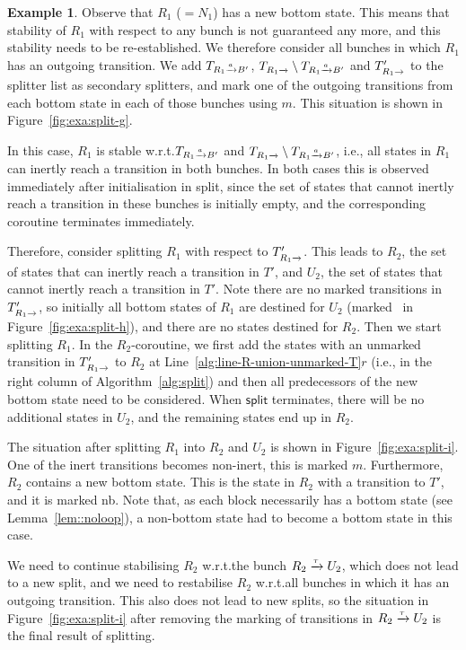 \documentclass[a4paper,10pt]{article}
\theoremstyle{definition}
\newtheorem{example}[definition]{Example}
\theoremstyle{plain}
\newcommand{\pijl}[1]{\mathrel{\text{$\xrightarrow{\smash[t]{#1}}$}}}
\newlength{\statetextwidth}\settowidth{\statetextwidth}{$s_0$}
\newcommand{\bluestatetext}{\smash{\tikz[baseline=-0.37\statetextwidth]{\node[blue state,thin,inner sep=0pt]{\makebox[0.5\statetextwidth]{}};}}}
\begin{document}
\begin{example}
Observe that $R_1$ ($=N_1$) has a new bottom state.
This means that stability of $R_1$ with respect to any bunch is not guaranteed any more, and this stability needs to be re-established.
We therefore consider all bunches in which $R_1$ has an outgoing transition.
We add $T_{R_1\pijl{a}B'}$, $T_{R_1 \pijl{}} \setminus T_{R_1 \pijl{a} B'}$ and $T'_{R_1\pijl{}}$ to the splitter list as secondary splitters,
and mark one of the outgoing transitions from each bottom state in each of those bunches using {\color{gray}$m$}.
This situation is shown in Figure~\ref{fig:exa:split-g}.

In this case, $R_1$ is stable w.r.t.\@ $T_{R_1\pijl{a}B'}$ and $T_{R_1 \pijl{}} \setminus T_{R_1 \pijl{a} B'}$, i.e., all states in $R_1$ can inertly reach a transition in both bunches.
In both cases this is observed immediately after initialisation in split,
since the set of states that cannot inertly reach a transition in these bunches is initially empty, and the corresponding coroutine terminates immediately.

Therefore, consider splitting $R_1$ with respect to $T'_{R_1\pijl{}}$. This leads to $R_2$, the set of states that can inertly reach a transition in $T'$, and $U_2$, the set of states that cannot inertly reach a transition in $T'$.
Note there are no marked transitions in $T'_{R_1\pijl{}}$,
so initially all bottom states of $R_1$ are destined for $U_2$ (marked \bluestatetext\ in Figure~\ref{fig:exa:split-h}), and there are no states destined for $R_2$.
Then we start splitting $R_1$.
In the $R_2$-coroutine, we first add the states with an unmarked transition in $T'_{R_1\pijl{}}$ to $R_2$ at Line~\ref{alg:line-R-union-unmarked-T}$r$
(i.e., in the right column of Algorithm~\ref{alg:split})
and then all predecessors of the new bottom state need to be considered.
When $\mathsf{split}$ terminates, there will be no additional states in $U_2$, and the remaining states end up in $R_2$.

The situation after splitting $R_1$ into $R_2$ and $U_2$ is shown in Figure~\ref{fig:exa:split-i}.
One of the inert transitions becomes non-inert, this is marked {\color{red}$m$}.
Furthermore, $R_2$ contains a new bottom state. This is the state in $R_2$ with a transition to $T'$, and it is marked nb.
Note that, as each block necessarily has a bottom state (see Lemma~\ref{lem::noloop}), a non-bottom state had to become a bottom state in this case.

We need to continue stabilising $R_2$ w.r.t.\@ the bunch $R_2 \pijl{\tau} U_2$,
which does not lead to a new split,
and we need to restabilise $R_2$ w.r.t.\@ all bunches in which it has an outgoing transition.
This also does not lead to new splits, so the situation in Figure~\ref{fig:exa:split-i}
after removing the marking of transitions in $R_2 \pijl{\tau} U_2$
is the final result of splitting.
\end{example}
\end{document}
